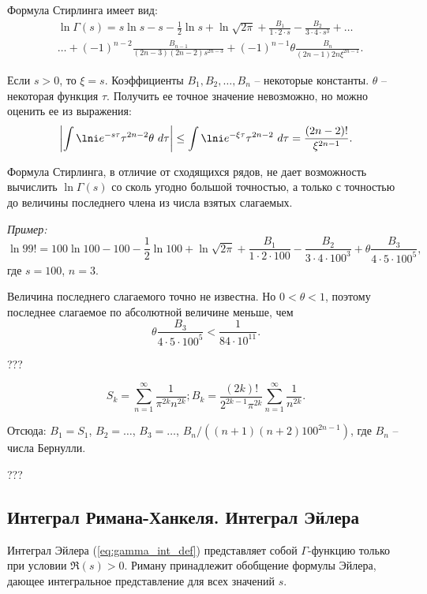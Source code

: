 Формула Стирлинга имеет вид:
\begin{align*}
    & \ln\Gamma(s) = s\ln s - s - \frac{1}{2}\ln s + \ln\sqrt{2\pi} + 
    \frac{B_1}{1\cdot2\cdot s} - \frac{B_2}{3\cdot4\cdot s^3} + \ldots \\
    & \ldots + (-1)^{n-2}\frac{B_{n-1}}{(2n-3)(2n-2)s^{2n-3}} + (-1)^{n-1}
    \theta\frac{B_n}{(2n-1)2n\xi^{2n-1}}.
\end{align*}

Если \( s > 0 \), то \( \xi = s \). Коэффициенты \( B_1, B_2, \ldots, B_n \) --
некоторые константы. \( \theta \) -- некоторая функция \( \tau \). Получить ее
точное значение невозможно, но можно оценить ее из выражения:
\[
    \left| \int\lni e^{-s\tau}\tau^{2n-2}\theta\ d\tau \right| \le
    \int\lni e^{-\xi\tau}\tau^{2n-2}\ d\tau = \frac{(2n-2)!}{\xi^{2n-1}}.
\]

Формула Стирлинга, в отличие от сходящихся рядов, не дает возможность вычислить
\( \ln\Gamma(s) \) со сколь угодно большой точностью, а только с точностью до
величины последнего члена из числа взятых слагаемых.

\emph{Пример:}
\[
    \ln99! = 100\ln100 - 100 - \frac{1}{2}\ln100 + \ln\sqrt{2\pi} +
    \frac{B_1}{1\cdot2\cdot100} - \frac{B_2}{3\cdot4\cdot100^3} +
    \theta\frac{B_3}{4\cdot5\cdot100^5},
\]
где \( s = 100 \), \( n = 3 \).

Величина последнего слагаемого точно не известна. Но \( 0 < \theta < 1 \),
поэтому последнее слагаемое по абсолютной величине меньше, чем
\[
    \theta\frac{B_3}{4\cdot5\cdot100^5} < \frac{1}{84\cdot10^{11}}.
\]

???

\[
    S_k = \sum\limits_{n=1}^\infty \frac{1}{\pi^{2k}n^{2k}}; B_k =
    \frac{(2k)!}{2^{2k-1}\pi^{2k}}\sum\limits_{n=1}^\infty\frac{1}{n^{2k}}.
\]

Отсюда: \( B_1 = S_1 \), \( B_2 = \ldots \), \( B_3 = \ldots \),
\( B_n/((n+1)(n+2)100^{2n-1}) \), где \( B_n \) -- числа Бернулли.

???

\subsection{Интеграл Римана-Ханкеля. Интеграл Эйлера}

Интеграл Эйлера (\ref{eq:gamma_int_def}) представляет собой \( \Gamma \)-функцию
только при условии \( \Re(s) > 0 \). Риману принадлежит обобщение формулы
Эйлера, дающее интегральное представление для всех значений \( s \).

